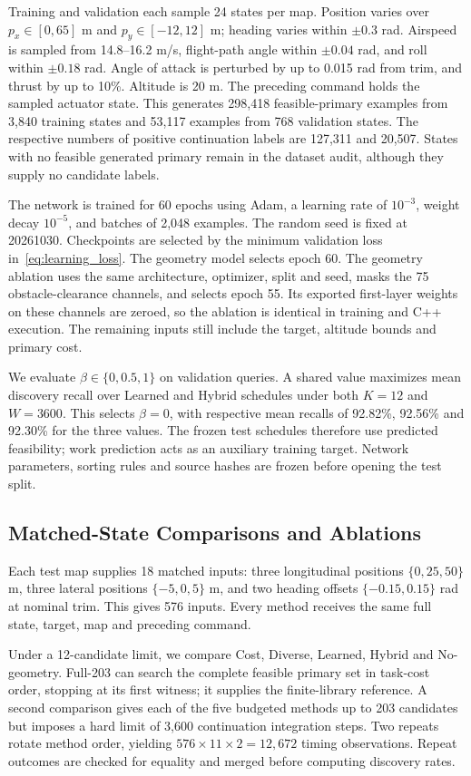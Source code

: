 Training and validation each sample 24 states per map. Position varies over $p_x\in[0,65]$ m and $p_y\in[-12,12]$ m; heading varies within $\pm0.3$ rad. Airspeed is sampled from 14.8--16.2 m/s, flight-path angle within $\pm0.04$ rad, and roll within $\pm0.18$ rad. Angle of attack is perturbed by up to 0.015 rad from trim, and thrust by up to 10\%. Altitude is 20 m. The preceding command holds the sampled actuator state. This generates 298,418 feasible-primary examples from 3,840 training states and 53,117 examples from 768 validation states. The respective numbers of positive continuation labels are 127,311 and 20,507. States with no feasible generated primary remain in the dataset audit, although they supply no candidate labels.

The network is trained for 60 epochs using Adam, a learning rate of $10^{-3}$, weight decay $10^{-5}$, and batches of 2,048 examples. The random seed is fixed at 20261030. Checkpoints are selected by the minimum validation loss in~\eqref{eq:learning_loss}. The geometry model selects epoch 60. The geometry ablation uses the same architecture, optimizer, split and seed, masks the 75 obstacle-clearance channels, and selects epoch 55. Its exported first-layer weights on these channels are zeroed, so the ablation is identical in training and C++ execution. The remaining inputs still include the target, altitude bounds and primary cost.

We evaluate $\beta\in\{0,0.5,1\}$ on validation queries. A shared value maximizes mean discovery recall over Learned and Hybrid schedules under both $K=12$ and $W=3600$. This selects $\beta=0$, with respective mean recalls of 92.82\%, 92.56\% and 92.30\% for the three values. The frozen test schedules therefore use predicted feasibility; work prediction acts as an auxiliary training target. Network parameters, sorting rules and source hashes are frozen before opening the test split.

\subsection{Matched-State Comparisons and Ablations}
Each test map supplies 18 matched inputs: three longitudinal positions $\{0,25,50\}$ m, three lateral positions $\{-5,0,5\}$ m, and two heading offsets $\{-0.15,0.15\}$ rad at nominal trim. This gives 576 inputs. Every method receives the same full state, target, map and preceding command.

Under a 12-candidate limit, we compare Cost, Diverse, Learned, Hybrid and No-geometry. Full-203 can search the complete feasible primary set in task-cost order, stopping at its first witness; it supplies the finite-library reference. A second comparison gives each of the five budgeted methods up to 203 candidates but imposes a hard limit of 3,600 continuation integration steps. Two repeats rotate method order, yielding $576\times11\times2=12{,}672$ timing observations. Repeat outcomes are checked for equality and merged before computing discovery rates.

